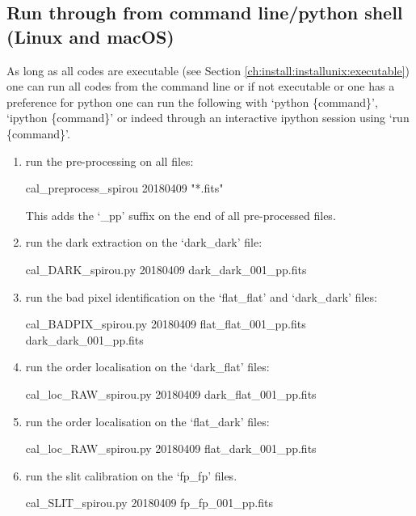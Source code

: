 \subsection{Run through from command line/python shell (Linux and macOS)}
\label{chapter:using_the_drs:working_example:run_cmd}

As long as all codes are executable (see Section \ref{ch:install:installunix:executable}) one can run all codes from the command line or if not executable or one has a preference for python one can run the following with `python \{command\}', `ipython \{command\}' or indeed through an interactive ipython session using `run \{command\}'.

\begin{enumerate}

\item run the pre-processing on all files:
\begin{cmdbox}
cal_preprocess_spirou 20180409 "*.fits"
\end{cmdbox}
\begin{note}
This adds the `\_pp' suffix on the end of all pre-processed files.
\end{note}

\item run the dark extraction on the `dark\_dark' file:
\begin{cmdbox}
cal_DARK_spirou.py 20180409 dark_dark_001_pp.fits
\end{cmdbox}

\item run the bad pixel identification on the `flat\_flat' and `dark\_dark' files:
\begin{cmdbox}
cal_BADPIX_spirou.py 20180409 flat_flat_001_pp.fits dark_dark_001_pp.fits
\end{cmdbox}

\item run the order localisation on the `dark\_flat' files:
\begin{cmdbox}
cal_loc_RAW_spirou.py 20180409 dark_flat_001_pp.fits
\end{cmdbox}

\item run the order localisation on the `flat\_dark' files:
\begin{cmdbox}
cal_loc_RAW_spirou.py 20180409 flat_dark_001_pp.fits
\end{cmdbox}

\item run the slit calibration on the `fp\_fp' files.
\begin{cmdbox}
cal_SLIT_spirou.py 20180409 fp_fp_001_pp.fits
\end{cmdbox}


\end{enumerate}
